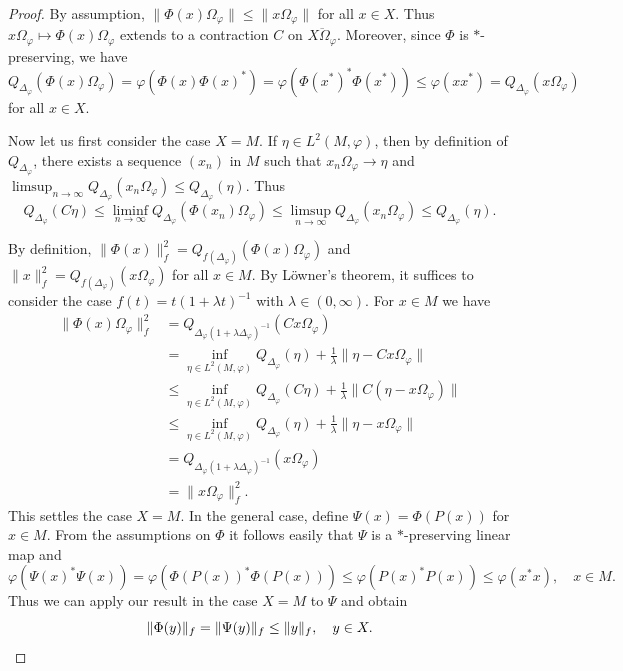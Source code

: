 \documentclass[a4paper,12pt]{amsart}
\newcommand{\norm}[1]{\lVert#1\rVert}
\renewcommand{\phi}{\varphi}
\theoremstyle{plain}
\theoremstyle{remark}
\theoremstyle{definition}
\begin{document}
\begin{proof}
    By assumption, $\norm{\Phi(x)\Omega_\phi}\leq \norm{x\Omega_\phi}$ for all $x\in X$. Thus $x\Omega_\phi\mapsto\Phi(x)\Omega_\phi$ extends to a contraction $C$ on $\overline{X\Omega_\phi}$. Moreover, since $\Phi$ is $\ast$-preserving, we have
    \begin{equation*}
        Q_{\Delta_\phi}(\Phi(x)\Omega_\phi)=\phi(\Phi(x)\Phi(x)^\ast)=\phi(\Phi(x^\ast)^\ast \Phi(x^\ast))\leq \phi(xx^\ast)=Q_{\Delta_\phi}(x\Omega_\phi)
    \end{equation*}
    for all $x\in X$.

    Now let us first consider the case $X=M$. If $\eta\in L^2(M,\phi)$, then by definition of $Q_{\Delta_\phi}$, there exists a sequence $(x_n)$ in $M$ such that $x_n\Omega_\phi\to \eta$ and $\limsup_{n\to\infty}Q_{\Delta_\phi}(x_n\Omega_\phi)\leq Q_{\Delta_\phi}(\eta)$. Thus
    \begin{equation*}
        Q_{\Delta_\phi}(C\eta)\leq\liminf_{n\to\infty}Q_{\Delta_\phi}(\Phi(x_n)\Omega_\phi)\leq \limsup_{n\to\infty}Q_{\Delta_\phi}(x_n\Omega_\phi)\leq Q_{\Delta_\phi}(\eta).
    \end{equation*}

    By definition, $\norm{\Phi(x)}_f^2=Q_{f(\Delta_\phi)}(\Phi(x)\Omega_\phi)$ and $\norm{x}_f^2=Q_{f(\Delta_\phi)}(x\Omega_\phi)$ for all $x\in M$. By Löwner's theorem, it suffices to consider the case $f(t)=t(1+\lambda t)^{-1}$ with $\lambda\in (0,\infty)$. For $x\in M$ we have
    \begin{align*}
         \norm{\Phi(x)\Omega_\phi}_f^2&=Q_{\Delta_\phi(1+\lambda \Delta_\phi)^{-1}}(Cx\Omega_\phi)\\
         &=\inf_{\eta\in L^2(M,\phi)}Q_{\Delta_\phi}(\eta)+\frac 1 \lambda\norm{\eta-Cx\Omega_\phi}\\
         &\leq \inf_{\eta\in L^2(M,\phi)}Q_{\Delta_\phi}(C\eta)+\frac 1 \lambda\norm{C(\eta-x\Omega_\phi)}\\
         &\leq \inf_{\eta\in L^2(M,\phi)}Q_{\Delta_\phi}(\eta)+\frac 1 \lambda\norm{\eta-x\Omega_\phi}\\
         &=Q_{\Delta_\phi(1+\lambda \Delta_\phi)^{-1}}(x\Omega_\phi)\\
         &=\norm{x\Omega_\phi}_f^2.
    \end{align*}
    This settles the case $X=M$. In the general case, define $\Psi(x)=\Phi(P(x))$ for $x\in M$. From the assumptions on $\Phi$ it follows easily that $\Psi$ is a $\ast$-preserving linear map and
    \begin{equation*}
        \phi(\Psi(x)^\ast\Psi(x))=\phi(\Phi(P(x))^\ast\Phi(P(x)))\leq \phi(P(x)^\ast P(x))\leq \phi(x^\ast x),\quad x\in M.
    \end{equation*}
    Thus we can apply our result in the case $X=M$ to $\Psi$ and obtain
    \begin{equation*}
        \norm{\Phi(y)}_f=\norm{\Psi(y)}_f\leq \norm{y}_f,\quad y\in X.\qedhere
    \end{equation*}
\end{proof}
\end{document}
